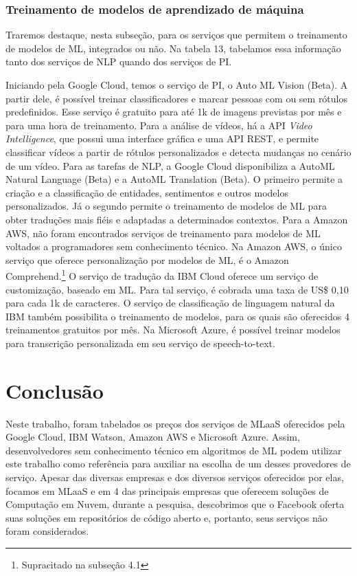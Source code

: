 \documentclass{article}
\begin{document}
\subsubsection{Treinamento de modelos de aprendizado de máquina}
Traremos destaque, nesta subseção, para os serviços que permitem o treinamento de modelos de ML, integrados ou não. Na tabela 13, tabelamos essa informação tanto dos serviços de NLP quando dos serviços de PI.

Iniciando pela Google Cloud, temos o serviço de PI, o Auto ML Vision (Beta). A partir dele, é possível treinar classificadores e marcar pessoas com ou sem rótulos predefinidos. Esse serviço é gratuito para até 1k de imagens previstas por mês e para uma hora de treinamento. Para a análise de vídeos, há a API \textit{Video Intelligence}, que possui uma interface gráfica e uma API REST, e permite classificar vídeos a partir de rótulos personalizados e detecta mudanças no cenário de um vídeo. Para as tarefas de NLP, a Google Cloud disponibiliza a AutoML Natural Language (Beta) e a AutoML Translation (Beta). O primeiro permite a criação e a classificação de entidades, sentimentos e outros modelos personalizados. Já o segundo permite o treinamento de modelos de ML para obter traduções mais fiéis e adaptadas a determinados contextos. Para a Amazon AWS, não foram encontrados serviços de treinamento para modelos de ML voltados a programadores sem conhecimento técnico. Na Amazon AWS, o único serviço que oferece personalização por modelos de ML, é o Amazon Comprehend.\footnote{Supracitado na subseção 4.1}
O serviço de tradução da IBM Cloud oferece um serviço de customização, baseado em ML. Para tal serviço, é cobrada uma taxa de US\$ 0,10 para cada 1k de caracteres. O serviço de classificação de linguagem natural da IBM também possibilita o treinamento de modelos, para os quais são oferecidos 4 treinamentos gratuitos por mês. Na Microsoft Azure, é possível treinar modelos para transcrição personalizada em seu serviço de speech-to-text.

\section{Conclusão}
Neste trabalho, foram tabelados os preços dos serviços de MLaaS oferecidos pela Google Cloud, IBM Watson, Amazon AWS e Microsoft Azure. Assim, desenvolvedores sem conhecimento técnico em algoritmos de ML podem utilizar este trabalho como referência para auxiliar na escolha de um desses provedores de serviço. Apesar das diversas empresas e dos diversos serviços oferecidos por elas, focamos em MLaaS e em 4 das principais empresas que oferecem soluções de Computação em Nuvem, durante a pesquisa, descobrimos que o Facebook oferta suas soluções em repositórios de código aberto e, portanto, seus serviços não foram considerados.
\end{document}
